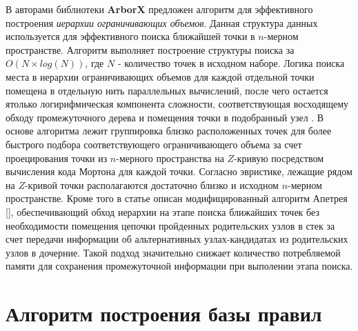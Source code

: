 В \cite{prokopenko2024revisingapetreisboundingvolume} авторами библиотеки \textbf{ArborX} предложен алгоритм для эффективного построения \textit{иерархии ограничивающих объемов}. Данная структура данных используется для эффективного поиска ближайшей точки в $n$-мерном пространстве. Алгоритм выполняет построение структуры поиска за $O(N\times log(N))$, где $N$ - количество точек в исходном наборе. Логика поиска места в иерархии ограничивающих объемов для каждой отдельной точки помещена в отдельную нить параллельных вычислений, после чего остается ятолько логирифмическая компонента сложности, соответствующая восходящему обходу промежуточного дерева и помещения точки в подобранный узел . В основе алгоритма лежит группировка близко расположенных точек для более быстрого подбора соответствующего ограничивающего объема за счет проецирования точки из $n$-мерного пространства на $Z$-кривую посредством вычисления кода Мортона для каждой точки. Согласно эвристике, лежащие рядом на $Z$-кривой точки располагаются достаточно близко и исходном $n$-мерном пространстве. Кроме того в статье описан модифицированный алгоритм Апетрея [], обеспечивающий обход иерархии на этапе поиска ближайших точек без необходимости помещения цепочки пройденных родительских узлов в стек за счет передачи информации об альтернативных узлах-кандидатах из родительских узлов в дочерние. Такой подход значительно снижает количество потребляемой памяти для сохранения промежуточной информации при выполении этапа поиска.

\section{Алгоритм построения базы правил}

